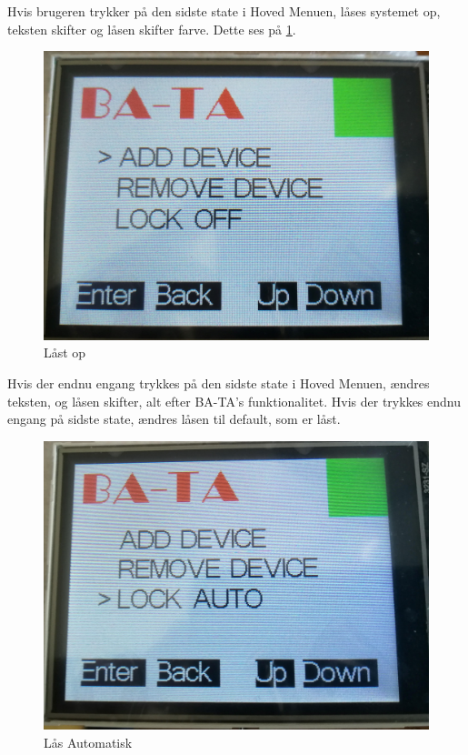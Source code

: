 Hvis brugeren trykker på den sidste state i Hoved Menuen, låses systemet op, teksten skifter og låsen skifter farve. Dette ses på \ref{fig:lockOff}.
\begin{figure}[H]
	\centering
	\includegraphics[width = 300 pt]{Img/lockOff.jpg}
	\caption{Låst op}
	\label{fig:lockOff}
\end{figure}
Hvis der endnu engang trykkes på den sidste state i Hoved Menuen, ændres teksten, og låsen skifter, alt efter BA-TA's funktionalitet. Hvis der trykkes endnu engang på sidste state, ændres låsen til default, som er låst. 
\begin{figure}[H]
	\centering
	\includegraphics[width = 300 pt]{Img/auto.jpg}
	\caption{Lås Automatisk}
	\label{fig:auto}
\end{figure}

